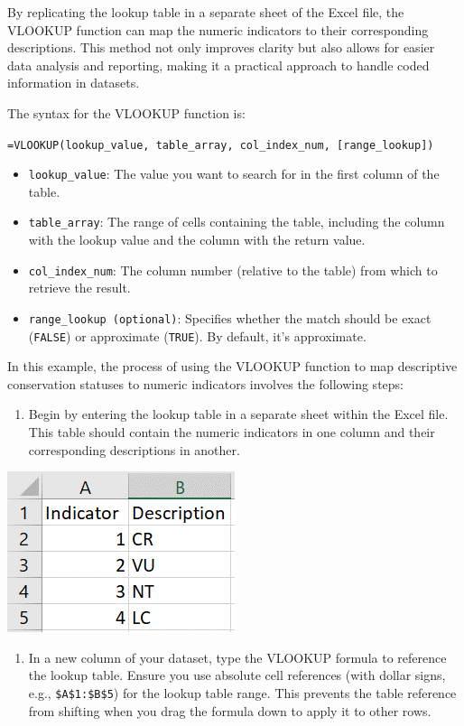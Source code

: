 \documentclass[
]{book}
\providecommand{\tightlist}{%
  \setlength{\itemsep}{0pt}\setlength{\parskip}{0pt}}
\begin{document}
By replicating the lookup table in a separate sheet of the Excel file, the VLOOKUP function can map the numeric indicators to their corresponding descriptions. This method not only improves clarity but also allows for easier data analysis and reporting, making it a practical approach to handle coded information in datasets.

The syntax for the VLOOKUP function is:

\texttt{=VLOOKUP(lookup\_value,\ table\_array,\ col\_index\_num,\ {[}range\_lookup{]})}

\begin{itemize}
\item
  \texttt{lookup\_value}: The value you want to search for in the first column of the table.
\item
  \texttt{table\_array}: The range of cells containing the table, including the column with the lookup value and the column with the return value.
\item
  \texttt{col\_index\_num}: The column number (relative to the table) from which to retrieve the result.
\item
  \texttt{range\_lookup\ (optional)}: Specifies whether the match should be exact (\texttt{FALSE}) or approximate (\texttt{TRUE}). By default, it's approximate.
\end{itemize}

In this example, the process of using the VLOOKUP function to map descriptive conservation statuses to numeric indicators involves the following steps:

\begin{enumerate}
\def\labelenumi{\arabic{enumi}.}
\tightlist
\item
  Begin by entering the lookup table in a separate sheet within the Excel file. This table should contain the numeric indicators in one column and their corresponding descriptions in another.
\end{enumerate}

\begin{center}\includegraphics[width=0.3\linewidth]{Figures/manipulation_1_lookup} \end{center}

\begin{enumerate}
\def\labelenumi{\arabic{enumi}.}
\setcounter{enumi}{1}
\tightlist
\item
  In a new column of your dataset, type the VLOOKUP formula to reference the lookup table. Ensure you use absolute cell references (with dollar signs, e.g., \texttt{\$A\$1:\$B\$5}) for the lookup table range. This prevents the table reference from shifting when you drag the formula down to apply it to other rows.
\end{enumerate}
\end{document}
